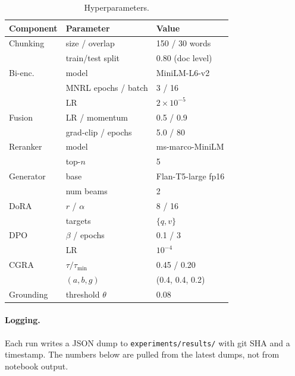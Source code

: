 \documentclass[11pt,a4paper]{article}
\begin{document}
\begin{table}[t]
\footnotesize
\setlength{\tabcolsep}{3pt}
\centering
\begin{tabular}{@{}lll@{}}
\toprule
Component & Parameter                     & Value \\
\midrule
Chunking  & size / overlap                & 150 / 30 words \\
          & train/test split              & 0.80 (doc level) \\
Bi-enc.   & model                         & MiniLM-L6-v2 \\
          & MNRL epochs / batch           & 3 / 16 \\
          & LR                            & $2\!\times\!10^{-5}$ \\
Fusion    & LR / momentum                 & 0.5 / 0.9 \\
          & grad-clip / epochs            & 5.0 / 80 \\
Reranker  & model                         & ms-marco-MiniLM \\
          & top-$n$                       & 5 \\
Generator & base                          & Flan-T5-large fp16 \\
          & num beams                     & 2 \\
DoRA      & $r$ / $\alpha$                & 8 / 16 \\
          & targets                       & $\{q, v\}$ \\
DPO       & $\beta$ / epochs              & 0.1 / 3 \\
          & LR                            & $10^{-4}$ \\
CGRA      & $\tau / \tau_{\min}$          & 0.45 / 0.20 \\
          & $(a, b, g)$                   & (0.4, 0.4, 0.2) \\
Grounding & threshold $\theta$            & 0.08 \\
\bottomrule
\end{tabular}
\caption{Hyperparameters.}
\label{tab:hparams}
\end{table}

\paragraph{Logging.} Each run writes a JSON dump to \texttt{experiments/results/} with git SHA and a timestamp. The numbers below are pulled from the latest dumps, not from notebook output.
\end{document}
